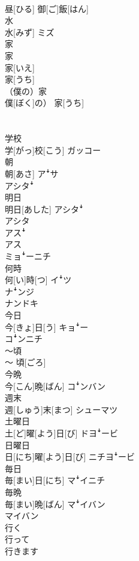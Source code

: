 \documentclass[8pt]{extreport}
\begin{document}
\begin{CJK}{UTF8}{min}
\\	昼[ひる] 御[ご]飯[はん]	
\\	水	
\\	水[みず]	ミズ
\\	家 
\\	家	
\\	家[いえ] 
\\	家[うち]	
\\	（僕の）家	
\\	僕[ぼく]の） 家[うち]	
\\	[エル]
\\	[エル]	
\\	学校	
\\	学[がっ]校[こう]	ガッコー
\\	朝	
\\	朝[あさ]	アꜜサ 
\\	アシタꜜ
\\	明日	
\\	明日[あした]	アシタꜜ 
\\	アシタ 
\\	アスꜜ 
\\	アス 
\\	ミョꜜーニチ
\\	何時	
\\	何[い]時[つ]	イꜜツ 
\\	ナꜜンジ 
\\	ナンドキ
\\	今日	
\\	今[きょ]日[う]	キョꜜー 
\\	コꜜンニチ
\\	〜頃	
\\	〜 頃[ごろ]	
\\	今晩	
\\	今[こん]晩[ばん]	コꜜンバン
\\	週末	
\\	週[しゅう]末[まつ]	シューマツ
\\	土曜日	
\\	土[ど]曜[よう]日[び]	ドヨꜜービ
\\	日曜日	
\\	日[にち]曜[よう]日[び]	ニチヨꜜービ
\\	毎日	
\\	毎[まい]日[にち]	マꜜイニチ
\\	毎晩	
\\	毎[まい]晩[ばん]	マꜜイバン 
\\	マイバン
\\	行く 
\\	行って 
\\	行きます	

\end{CJK}
\end{document}
